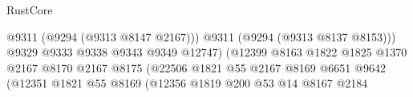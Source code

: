 \begin{lexlean}{RustCore}
\begin{coremodule}
                                                                  @9311
                                                                  (@9294 (@9313 @8147 @2167)))
                                                                @9311
                                                                (@9294 (@9313 @8137 @8153)))
                                                              @9329
                                                              @9333
                                                              @9338
                                                              @9343
                                                              @9349
                                                              @12747)
                                                            (@12399
                                                              @8163
                                                              @1822
                                                              @1825
                                                              @1370
                                                              @2167
                                                              @8170
                                                              @2167
                                                              @8175
                                                              (@22506
                                                                @1821
                                                                @55
                                                                @2167
                                                                @8169
                                                                @6651
                                                                @9642
                                                                (@12351
                                                                  @1821
                                                                  @55
                                                                  @8169
                                                                  (@12356
                                                                    @1819
                                                                    @200
                                                                    @53
                                                                    @14
                                                                    @8167
                                                                    @2184

\end{coremodule}
\end{lexlean}
